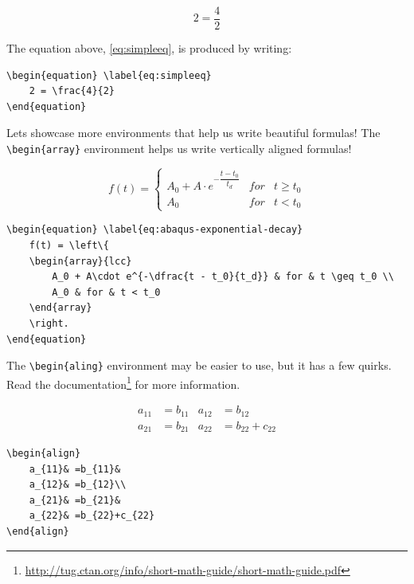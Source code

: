 \begin{equation} \label{eq:simpleeq}
	2 = \frac{4}{2}
\end{equation}

The equation above, \cref{eq:simpleeq}, is produced by writing:

\begin{lstlisting}[language={[LaTeX]TeX}]
\begin{equation} \label{eq:simpleeq}
	2 = \frac{4}{2}
\end{equation}
\end{lstlisting}

Lets showcase more environments that help us write beautiful formulas! The \verb|\begin{array}| environment helps us write vertically aligned formulas!

\begin{equation} \label{eq:abaqus-exponential-decay}
f(t) = \left\{
	\begin{array}{lcc}
		A_0 + A\cdot e^{-\dfrac{t - t_0}{t_d}} & for & t \geq t_0 \\
		A_0 & for & t < t_0
	\end{array}
	\right.
\end{equation}

\begin{lstlisting}[language={[LaTeX]TeX}]
\begin{equation} \label{eq:abaqus-exponential-decay}
	f(t) = \left\{
	\begin{array}{lcc}
		A_0 + A\cdot e^{-\dfrac{t - t_0}{t_d}} & for & t \geq t_0 \\
		A_0 & for & t < t_0
	\end{array}
	\right.
\end{equation}
\end{lstlisting}


The \verb|\begin{aling}| environment may be easier to use, but it has a few quirks. Read the documentation\footnote{\url{http://tug.ctan.org/info/short-math-guide/short-math-guide.pdf}} for more information.

\begin{align}
	a_{11}& =b_{11}&
	a_{12}& =b_{12}\\
	a_{21}& =b_{21}&
	a_{22}& =b_{22}+c_{22}
\end{align}

\begin{lstlisting}[language={[LaTeX]TeX}]
\begin{align}
	a_{11}& =b_{11}&
	a_{12}& =b_{12}\\
	a_{21}& =b_{21}&
	a_{22}& =b_{22}+c_{22}
\end{align}
\end{lstlisting}

